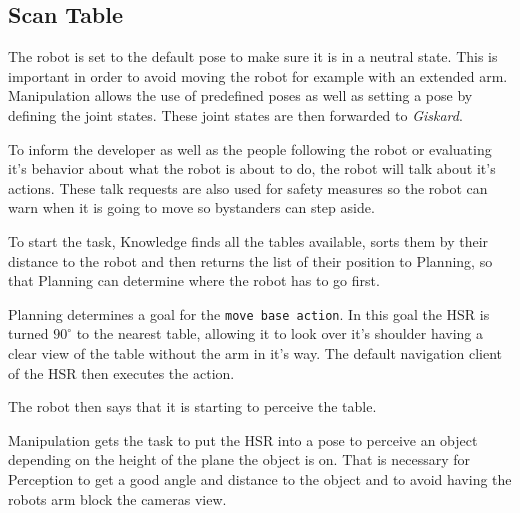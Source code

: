 \documentclass[main.tex]{subfiles}
\begin{document}
	\subsection{Scan Table}
	
	\begin{manipulation}
	The robot is set to the default pose to make sure it is in a neutral state. This is important in order to avoid moving the robot for example with an extended arm. Manipulation allows the use of predefined poses as well as setting a pose by defining the joint states. These joint states are then forwarded to \textit{Giskard}.\end{manipulation}
	
	\begin{nlp}
	To inform the developer as well as the people following the robot or evaluating it's behavior about what the robot is about to do, the robot will talk about it's actions. These talk requests are also used for safety measures so the robot can warn when it is going to move so bystanders can step aside. \end{nlp}
	
	\begin{knowledge}
	To start the task, Knowledge finds all the tables available, sorts them by their distance to the robot and then returns the list of their position to Planning, so that Planning can determine where the robot has to go first.\end{knowledge}
	
	\begin{navigation}
	Planning determines a goal for the \texttt{move base action}. In this goal the HSR is turned $90^\circ$ to the nearest table, allowing it to look over it's shoulder having a clear view of the table without the arm in it's way. The default navigation client of the HSR then executes the action. \end{navigation}
	
	\begin{nlp}
	The robot then says that it is starting to perceive the table.\end{nlp}
	
	\begin{manipulation}
	Manipulation gets the task to put the HSR into a pose to perceive an object depending on the height of the plane the object is on.
    That is necessary for Perception to get a good angle and distance to the object and to avoid having the robots arm block the cameras view.
    \end{manipulation}
	
\end{document}
